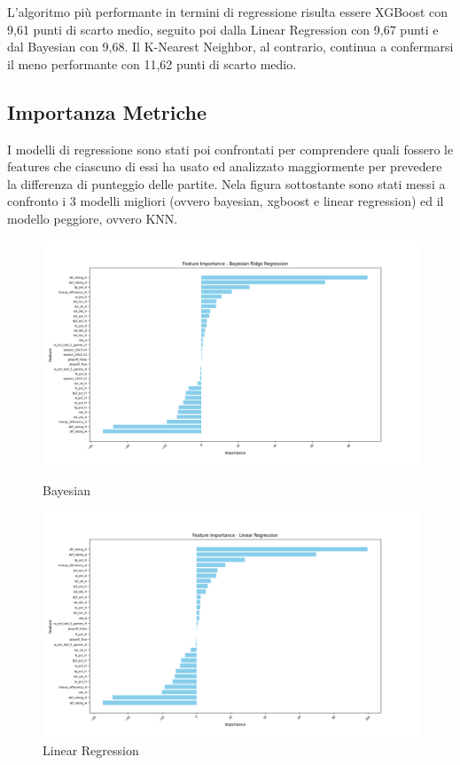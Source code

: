 L'algoritmo più performante in termini di regressione risulta essere XGBoost con 9,61 punti di scarto medio, seguito poi dalla Linear Regression con 9,67 punti e dal Bayesian con 9,68.
Il K-Nearest Neighbor, al contrario, continua a confermarsi il meno performante con 11,62 punti di scarto medio.

\subsection{Importanza Metriche}
I modelli di regressione sono stati poi confrontati per comprendere quali fossero le features che ciascuno di essi ha usato ed analizzato maggiormente per prevedere la differenza di punteggio delle partite. Nela figura sottostante sono stati messi a confronto i 3 modelli migliori (ovvero bayesian, xgboost e linear regression) ed il modello peggiore, ovvero KNN.

\begin{figure}[H]
    \centering
    \begin{minipage}[b]{0.45\linewidth}
        \centering
        \includegraphics[width=\linewidth]{img/bayesian.png}
        \caption{Bayesian}
        \label{fig:first_label}
    \end{minipage}
    \hspace{0.05\linewidth}
    \begin{minipage}[b]{0.45\linewidth}
        \centering
        \includegraphics[width=\linewidth]{img/linear_regression.png}
        \caption{Linear Regression}
        \label{fig:second_label}
    \end{minipage}
\end{figure}

